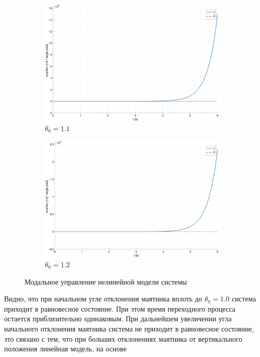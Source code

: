 \begin{figure}[ht!]
\begin{subfigure}[b]{0.45\textwidth}
        \includegraphics[width=\textwidth]{media/plots/modal_control/modal_control_out_5.png}
        \caption{$\theta_0 = 1.1$}
    \end{subfigure}
    \begin{subfigure}[b]{0.45\textwidth}
        \includegraphics[width=\textwidth]{media/plots/modal_control/modal_control_out_6.png}
        \caption{$\theta_0 = 1.2$}
    \end{subfigure}
    \caption{Модальное управление нелинейной модели системы}
    \label{fig:modal_control_initials}
\end{figure}
Видно, что при начальном угле отклонения маятника вплоть до $\theta_0 = 1.0$ система приходит в
равновесное состояние. При этом время переходного процесса остается приблизительно одинаковым. 
При дальнейшем увеличении угла начального отклонения маятника система не приходит в равновесное состояние, 
это связано с тем, что при больших отклонениях маятника от вертикального положения линейная модель, на основе 
